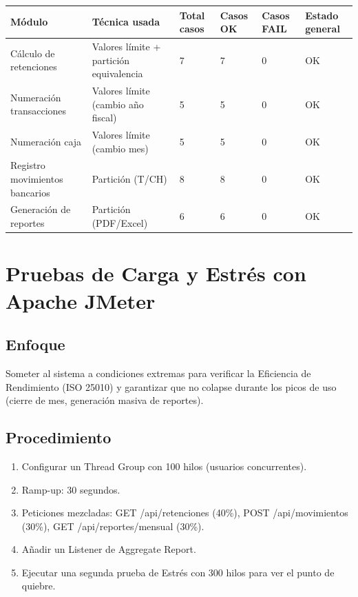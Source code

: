 \documentclass[stu]{apa7}
\begin{document}
\begin{longtable}{|L{3.5cm}|C{2.5cm}|C{1.5cm}|C{1.5cm}|C{1.5cm}|C{2.5cm}|}
\hline
{}
\textbf{Módulo} & \textbf{Técnica usada} & \textbf{Total casos} & \textbf{Casos OK} & \textbf{Casos FAIL} & \textbf{Estado general} \\
\hline
Cálculo de retenciones & Valores límite + partición equivalencia & 7 & 7 & 0 & OK \\
\hline
Numeración transacciones & Valores límite (cambio año fiscal) & 5 & 5 & 0 & OK \\
\hline
Numeración caja & Valores límite (cambio mes) & 5 & 5 & 0 & OK \\
\hline
Registro movimientos bancarios & Partición (T/CH) & 8 & 8 & 0 & OK \\
\hline
Generación de reportes & Partición (PDF/Excel) & 6 & 6 & 0 & OK \\
\hline
\end{longtable}

\section{Pruebas de Carga y Estrés con Apache JMeter}

\subsection{Enfoque}

Someter al sistema a condiciones extremas para verificar la Eficiencia de Rendimiento (ISO 25010) y garantizar que no colapse durante los picos de uso (cierre de mes, generación masiva de reportes).

\subsection{Procedimiento}

\begin{enumerate}
    \item Configurar un Thread Group con 100 hilos (usuarios concurrentes).
    \item Ramp-up: 30 segundos.
    \item Peticiones mezcladas: GET /api/retenciones (40\%), POST /api/movimientos (30\%), GET /api/reportes/mensual (30\%).
    \item Añadir un Listener de Aggregate Report.
    \item Ejecutar una segunda prueba de Estrés con 300 hilos para ver el punto de quiebre.
\end{enumerate}
\end{document}

